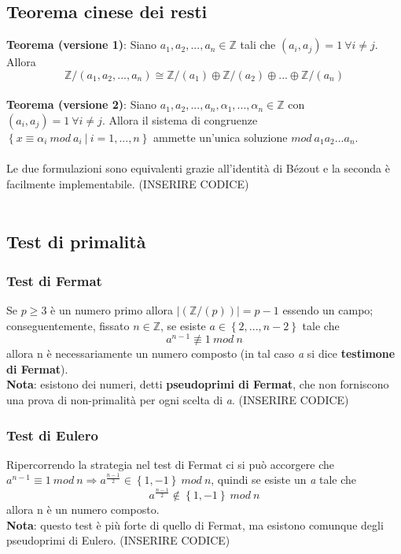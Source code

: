 \documentclass{article}
\begin{document}
\subsection{Teorema cinese dei resti}
\textbf{Teorema (versione 1)}: Siano \(a_1,a_2,...,a_n\in\mathbb{Z}\) tali che \((a_i,a_j)=1\ \forall i\neq j\). Allora
\[\mathbb{Z}/(a_1,a_2,...,a_n)\cong \mathbb{Z}/(a_1)\oplus\mathbb{Z}/(a_2)\oplus...\oplus\mathbb{Z}/(a_n)\]\\
\textbf{Teorema (versione 2)}:  Siano \(a_1,a_2,...,a_n,\alpha_1,...,\alpha_n\in\mathbb{Z}\) con \((a_i,a_j)=1\ \forall i\neq j\). Allora il sistema di congruenze \(\left\{x\equiv \alpha_i\ mod\ a_i\ |\ i=1,...,n\right\}\) ammette un'unica soluzione \(mod\ a_1a_2...a_n\).\\ \\
Le due formulazioni sono equivalenti grazie all'identità di Bézout e la seconda è facilmente implementabile. (INSERIRE CODICE)\\ \\
\subsection{Test di primalità}
\subsubsection{Test di Fermat}
Se \(p\ge 3\) è un numero primo allora \(\left|(\mathbb{Z}/(p))\right|=p-1\) essendo un campo; conseguentemente, fissato \(n\in\mathbb{Z}\), se esiste \(a\in\left\{2,...,n-2\right\}\) tale che \[a^{n-1}\not\equiv 1\ mod\ n\]
allora n è necessariamente un numero composto (in tal caso \textit{a} si dice \textbf{testimone di Fermat}).\\ \textbf{Nota}: esistono dei numeri, detti \textbf{pseudoprimi di Fermat}, che non forniscono una prova di non-primalità per ogni scelta di \textit{a}.
(INSERIRE CODICE)\\ 
\subsubsection{Test di Eulero}
Ripercorrendo la strategia nel test di Fermat ci si può accorgere che \(a^{n-1}\equiv 1\ mod\ n\Rightarrow a^{\frac{n-1}{2}}\in \left\{1,-1\right\}\ mod\ n\), quindi se esiste un \textit{a} tale che 
\[a^{\frac{n-1}{2}}\not\in \left\{1,-1\right\}\ mod\ n\]
allora n è un numero composto.\\ \textbf{Nota}: questo test è più forte di quello di Fermat, ma esistono comunque degli pseudoprimi di Eulero. (INSERIRE CODICE)\\
\end{document}

